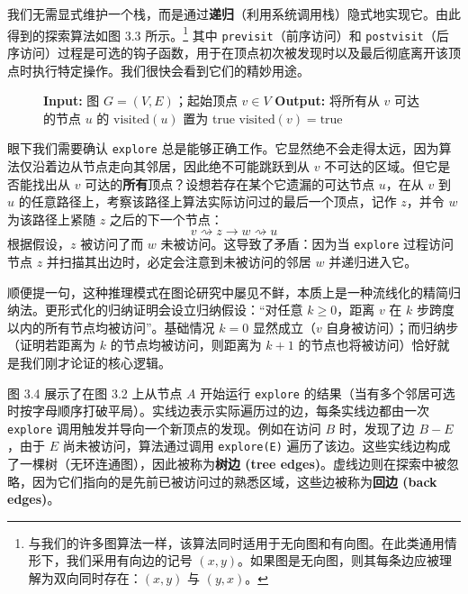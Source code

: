 我们无需显式维护一个栈，而是通过\textbf{递归}（利用系统调用栈）隐式地实现它。由此得到的探索算法如图 3.3 所示。\footnote{与我们的许多图算法一样，该算法同时适用于无向图和有向图。在此类通用情形下，我们采用有向边的记号 $(x, y)$。如果图是无向图，则其每条边应被理解为双向同时存在：$(x, y)$ 与 $(y, x)$。} 其中 \texttt{previsit}（前序访问）和 \texttt{postvisit}（后序访问）过程是可选的钩子函数，用于在顶点初次被发现时以及最后彻底离开该顶点时执行特定操作。我们很快会看到它们的精妙用途。

\begin{figure}[htbp]
\centering
\begin{tcolorbox}[colback=white,colframe=gray!50!black,title={\textbf{图 3.3}\quad 探索从特定顶点可达的所有节点 (\texttt{explore})}]
\begin{algorithmic}[1]
    \State \textbf{Input:} 图 $G = (V, E)$；起始顶点 $v \in V$
    \State \textbf{Output:} 将所有从 $v$ 可达的节点 $u$ 的 $\text{visited}(u)$ 置为 true
    \State $\text{visited}(v) = \text{true}$
    \State {}
            \State {}
        \EndIf
    \EndFor
    \State {}
\EndProcedure
\end{algorithmic}
\end{tcolorbox}
\label{fig:explore_proc}
\end{figure}

眼下我们需要确认 \texttt{explore} 总是能够正确工作。它显然绝不会走得太远，因为算法仅沿着边从节点走向其邻居，因此绝不可能跳跃到从 $v$ 不可达的区域。但它是否能找出从 $v$ 可达的\textbf{所有}顶点？设想若存在某个它遗漏的可达节点 $u$，在从 $v$ 到 $u$ 的任意路径上，考察该路径上算法实际访问过的最后一个顶点，记作 $z$，并令 $w$ 为该路径上紧随 $z$ 之后的下一个节点：
\[
v \rightsquigarrow z \longrightarrow w \rightsquigarrow u
\]
根据假设，$z$ 被访问了而 $w$ 未被访问。这导致了矛盾：因为当 \texttt{explore} 过程访问节点 $z$ 并扫描其出边时，必定会注意到未被访问的邻居 $w$ 并递归进入它。

顺便提一句，这种推理模式在图论研究中屡见不鲜，本质上是一种流线化的精简归纳法。更形式化的归纳证明会设立归纳假设：“对任意 $k \ge 0$，距离 $v$ 在 $k$ 步跨度以内的所有节点均被访问”。基础情况 $k = 0$ 显然成立（$v$ 自身被访问）；而归纳步（证明若距离为 $k$ 的节点均被访问，则距离为 $k + 1$ 的节点也将被访问）恰好就是我们刚才论证的核心逻辑。

图 3.4 展示了在图 3.2 上从节点 $A$ 开始运行 \texttt{explore} 的结果（当有多个邻居可选时按字母顺序打破平局）。实线边表示实际遍历过的边，每条实线边都由一次 \texttt{explore} 调用触发并导向一个新顶点的发现。例如在访问 $B$ 时，发现了边 $B - E$，由于 $E$ 尚未被访问，算法通过调用 \texttt{explore(E)} 遍历了该边。这些实线边构成了一棵树（无环连通图），因此被称为\textbf{树边 (tree edges)}。虚线边则在探索中被忽略，因为它们指向的是先前已被访问过的熟悉区域，这些边被称为\textbf{回边 (back edges)}。

